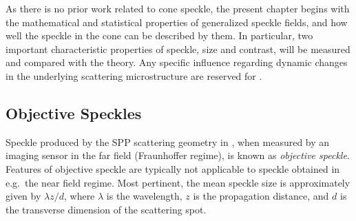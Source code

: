 As there is no prior work related to cone speckle, the present chapter begins
with the mathematical and statistical properties of generalized speckle
fields, and how well the speckle in the cone can be described by them.  In
particular, two important characteristic properties of speckle, size
and contrast, will be measured and compared with the theory.  Any specific
influence regarding dynamic changes in the underlying scattering
microstructure are reserved for .

\subsection{Objective Speckles}
Speckle produced by the SPP scattering geometry in
, when measured by an imaging sensor in the far
field (Fraunhoffer regime), is known as \textit{objective speckle}.  Features
of objective speckle are typically not applicable to speckle obtained in e.g.\
the near field regime.  Most pertinent, the mean speckle size is approximately
given by $\lambda z/d$, where $\lambda$ is the wavelength, $z$ is the
propagation distance, and $d$ is the transverse dimension of the scattering
spot\cite{dainty1975laser}.
